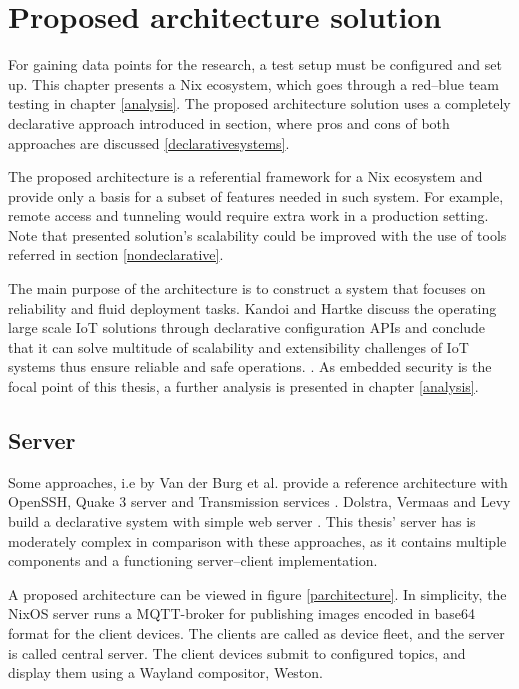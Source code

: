 \chapter{Proposed architecture solution} \label{architecture}

For gaining data points for the research, a test setup must be configured and set up. This chapter presents a Nix ecosystem, which goes through a red–blue team testing in chapter \ref{analysis}. The proposed architecture solution uses a completely declarative approach introduced in section, where pros and cons of both approaches are discussed \ref{declarativesystems}.

The proposed architecture is a referential framework for a Nix ecosystem and provide only a basis for a subset of features needed in such system. For example, remote access and tunneling would require extra work in a production setting. Note that presented solution's scalability could be improved with the use of tools referred in section \ref{nondeclarative}.

The main purpose of the architecture is to construct a system that focuses on reliability and fluid deployment tasks. Kandoi and Hartke discuss the operating large scale IoT solutions through declarative configuration APIs and conclude that it can solve multitude of scalability and extensibility challenges of IoT systems thus ensure reliable and safe operations. \cite{kandoi2021operating}. As embedded security is the focal point of this thesis, a further analysis is presented in chapter \ref{analysis}. 

\section{Server}

Some approaches, i.e by Van der Burg et al. provide a reference architecture with OpenSSH, Quake 3 server and Transmission services \cite{van2013reference}. Dolstra, Vermaas and Levy build a declarative system with simple web server \cite{dolstra2013charon}. This thesis' server has is moderately complex in comparison with these approaches, as it contains multiple components and a functioning server–client implementation.

A proposed architecture can be viewed in figure \ref{parchitecture}. In simplicity, the NixOS server runs a MQTT-broker for publishing images encoded in base64 format for the client devices. The clients are called as device fleet, and the server is called central server. The client devices submit to configured topics, and display them using a Wayland compositor, Weston.

